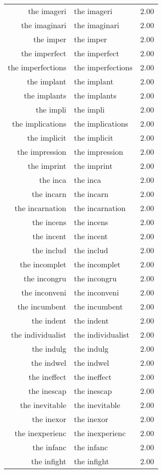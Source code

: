 \begin{table}[ht]
\begin{tabular}{rlr}
  the imageri & the imageri & 2.00 \\ 
  the imaginari & the imaginari & 2.00 \\ 
  the imper & the imper & 2.00 \\ 
  the imperfect & the imperfect & 2.00 \\ 
  the imperfections & the imperfections & 2.00 \\ 
  the implant & the implant & 2.00 \\ 
  the implants & the implants & 2.00 \\ 
  the impli & the impli & 2.00 \\ 
  the implications & the implications & 2.00 \\ 
  the implicit & the implicit & 2.00 \\ 
  the impression & the impression & 2.00 \\ 
  the imprint & the imprint & 2.00 \\ 
  the inca & the inca & 2.00 \\ 
  the incarn & the incarn & 2.00 \\ 
  the incarnation & the incarnation & 2.00 \\ 
  the incens & the incens & 2.00 \\ 
  the incent & the incent & 2.00 \\ 
  the includ & the includ & 2.00 \\ 
  the incomplet & the incomplet & 2.00 \\ 
  the incongru & the incongru & 2.00 \\ 
  the inconveni & the inconveni & 2.00 \\ 
  the incumbent & the incumbent & 2.00 \\ 
  the indent & the indent & 2.00 \\ 
  the individualist & the individualist & 2.00 \\ 
  the indulg & the indulg & 2.00 \\ 
  the indwel & the indwel & 2.00 \\ 
  the ineffect & the ineffect & 2.00 \\ 
  the inescap & the inescap & 2.00 \\ 
  the inevitable & the inevitable & 2.00 \\ 
  the inexor & the inexor & 2.00 \\ 
  the inexperienc & the inexperienc & 2.00 \\ 
  the infanc & the infanc & 2.00 \\ 
  the infight & the infight & 2.00 \\ 

\end{tabular}
\end{table}

